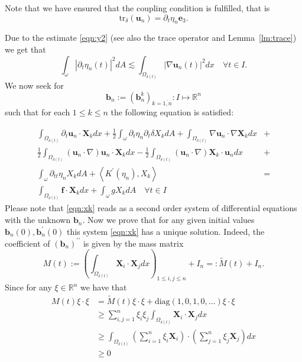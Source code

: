 \documentclass[10pt,a4paper]{article}
\numberwithin{equation}{section}
\begin{document}
  
Note that we have ensured that the coupling condition is fulfilled, that is  \[\text{tr}_{\delta}(\mathbf{u}_{n})=\partial_{t}\eta_{n}\mathbf{e}_3.
\]  


Due to the estimate \eqref{eqn:y2} (see also the trace operator and Lemma~\ref{lm:trace}) we get that
\begin{equation}\label{eqn:trace(eta_n)}
\int_{\omega}\left|\partial_{t}\eta_{n}\left(t\right)\right|^{2}dA\lesssim\int_{\Omega_{\mathcal{\delta}\left(t\right)}}\left|\nabla\mathbf{u}_{n}\left(t\right)\right|^{2}dx\quad\forall t\in I.
\end{equation}
We now  seek for 
\[
\mathbf{b}_{n}:=\left(\mathbf{b}_{n}^{k}\right)_{k=\overline{1,n}}:I\mapsto\mathbb{R}^{n}
\]
such that for each $1\le k\le n$ the following equation is satisfied:

\begin{equation}\label{eqn:xk}
\begin{aligned}\int_{\Omega_{\delta\left(t\right)}}\partial_{t}\mathbf{u}_{n}\cdot\mathbf{X}_{k}dx+\frac{1}{2}\int_{\omega}\partial_{t}\eta_{n}\partial_{t}\delta X_{k}dA+\int_{\Omega_{\delta\left(t\right)}}\nabla\mathbf{u}_{n}\cdot\nabla\mathbf{X}_{k}dx & +\\
\frac{1}{2}\int_{\Omega_{\delta\left(t\right)}}\left(\mathbf{u}_{n}\cdot\nabla\right)\mathbf{u}_{n}\cdot\mathbf{X}_{k}dx-\frac{1}{2}\int_{\Omega_{\delta\left(t\right)}}\left(\mathbf{u}_{n}\cdot\nabla\right)\mathbf{X}_{k}\cdot\mathbf{u}_{n}dx & +\\
\int_{\omega}\partial_{tt}\eta_{n}X_{k}dA+\left\langle K^{\prime}\left(\eta_{n}\right),X_{k}\right\rangle  & =\\
\int_{\Omega_{\delta\left(t\right)}}\mathbf{f}\cdot\mathbf{X}_{k}dx+\int_{\omega}gX_{k}dA\quad\forall t\in I
\end{aligned}
\end{equation}
Please note  that   \eqref{eqn:xk} reads as a second order system of  differential equations with the unknown $\mathbf{b}_n$. Now we prove that for any given initial values $\mathbf{b}_{n}\left(0\right),\mathbf{b}_{n}^{\prime}\left(0\right)$ this system \eqref{eqn:xk} has a unique solution. 
Indeed,  the coefficient of $\left(\mathbf{b}_{n}\right)^{\prime\prime}$ is given by the mass matrix
\[
M\left(t\right):=\left(\int_{\Omega_{\delta\left(t\right)}}\mathbf{X}_{i}\cdot\mathbf{X}_{j}dx\right)_{1\le i,j\le n}+I_{n}=:\tilde{M}\left(t \right)+I_n.
\]
Since for any $\xi \in \mathbb{R}^{n}$ we have that 
\begin{equation}\label{eqn:M(t)-pos-def}
\begin{aligned}M\left(t\right)\xi\cdot\xi & =\tilde{M}\left(t\right)\xi\cdot\xi+\text{diag}\left(1,0,1,0,\ldots\right)\xi\cdot\xi\\
 & \ge\sum_{i,j=1}^{n}\xi_{i}\xi_{j}\int_{\Omega_{\delta\left(t\right)}}\mathbf{X}_{i}\cdot\mathbf{X}_{j}dx\\
 & \ge\int_{\Omega_{\delta\left(t\right)}}\left(\sum_{i=1}^{n}\xi_{i}\mathbf{X}_{i}\right)\cdot\left(\sum_{j=1}^{n}\xi_{j}\mathbf{X}_{j}\right)dx\\
 & \ge0
\end{aligned}
\end{equation}
\end{document}

